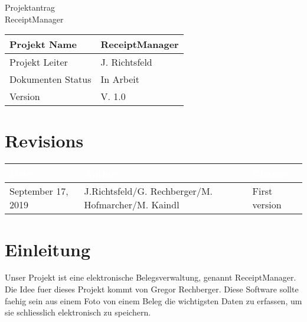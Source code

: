\documentclass[12pt]{article}
\theoremstyle{definition}
\newcommand{\projectname}{ReceiptManager}
\newcommand{\productname}{ReceiptManager}
\newcommand{\projectleader}{J. Richtsfeld}
\newcommand{\documentstatus}{In Arbeit}
\newcommand{\version}{V. 1.0}
\begin{document}
\begin{titlepage}
\begin{flushright}
\end{flushright}

\vspace{10em}

\begin{center}
{\Huge Projektantrag} \\[3em]
{\LARGE \productname} \\[3em]
\end{center}

\begin{flushleft}
\begin{tabular}{|l|l|}
\hline
Projekt Name & \projectname \\ \hline
Projekt Leiter & \projectleader \\ \hline
Dokumenten Status & \documentstatus \\ \hline
Version & \version \\ \hline
\end{tabular}
\end{flushleft}

\end{titlepage}
\section*{Revisions}
\begin{tabular}{|l|l|l|}
\hline
\cellcolor[gray]{0.5}\textcolor{white}{Date} & \cellcolor[gray]{0.5}\textcolor{white}{Author} & \cellcolor[gray]{0.5}\textcolor{white}{Change} \\ \hline
September 17, 2019&J.Richtsfeld/G. Rechberger/M. Hofmarcher/M. Kaindl&First version \\ \hline
\end{tabular}
\pagebreak

\tableofcontents
\pagebreak

\section{Einleitung}
Unser Projekt ist eine elektronische Belegsverwaltung, genannt ReceiptManager. Die Idee fuer dieses Projekt kommt von Gregor Rechberger. Diese Software sollte faehig sein aus einem Foto von einem Beleg die wichtigsten Daten zu erfassen, um sie schliesslich elektronisch zu speichern. 
\pagebreak
\end{document}
